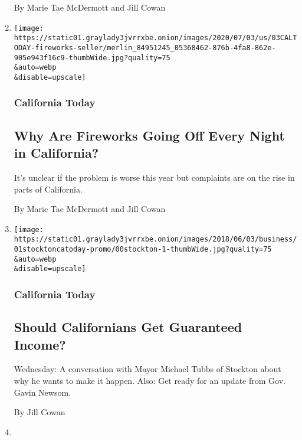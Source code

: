 \begin{enumerate}
  By Marie Tae McDermott and Jill Cowan
\item
  \href{/2020/07/03/us/fireworks-every-night-ca.html}{}

  \texttt{[image: https://static01.graylady3jvrrxbe.onion/images/2020/07/03/us/03CALTODAY-fireworks-seller/merlin\_84951245\_05368462-876b-4fa8-862e-905e943f16c9-thumbWide.jpg?quality=75\\\&auto=webp\\\&disable=upscale]}

  \hypertarget{california-today-6}{%
  \subsubsection{California Today}\label{california-today-6}}

  \hypertarget{why-are-fireworks-going-off-every-night-in-california}{%
  \subsection{Why Are Fireworks Going Off Every Night in
  California?}\label{why-are-fireworks-going-off-every-night-in-california}}

  It's unclear if the problem is worse this year but complaints are on
  the rise in parts of California.

  By Marie Tae McDermott and Jill Cowan
\item
  \href{/2020/07/01/us/ubi-california.html}{}

  \texttt{[image: https://static01.graylady3jvrrxbe.onion/images/2018/06/03/business/01stocktoncatoday-promo/00stockton-1-thumbWide.jpg?quality=75\\\&auto=webp\\\&disable=upscale]}

  \hypertarget{california-today-7}{%
  \subsubsection{California Today}\label{california-today-7}}

  \hypertarget{should-californians-get-guaranteed-income}{%
  \subsection{Should Californians Get Guaranteed
  Income?}\label{should-californians-get-guaranteed-income}}

  Wednesday: A conversation with Mayor Michael Tubbs of Stockton about
  why he wants to make it happen. Also: Get ready for an update from
  Gov. Gavin Newsom.

  By Jill Cowan
\item
  \href{/article/face-shield-mask-california-coronavirus.html}{}


\end{enumerate}
